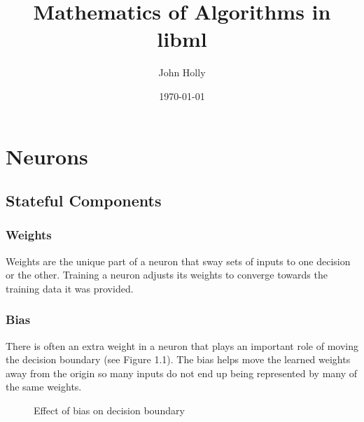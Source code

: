 \documentclass[a4paper,12pt]{book}
\title{Mathematics of Algorithms in libml}
\author{John Holly}
\date{\today}
\begin{document}
\maketitle

\tableofcontents

\chapter{Neurons}

\section{Stateful Components}

	\subsection{Weights}
	\text Weights are the unique part of a neuron that sway sets of inputs to one decision or the other. Training a neuron adjusts its weights to converge towards the training data it was provided.

	\subsection{Bias}
	\text There is often an extra weight in a neuron that plays an important role of moving the decision boundary (see Figure 1.1). The bias helps move the learned weights away from the origin so many inputs do not end up being represented by many of the same weights.

	\begin{figure}
	\begin{center}
	\caption{Effect of bias on decision boundary}
	\end{center}
	\end{figure}
\end{document}
